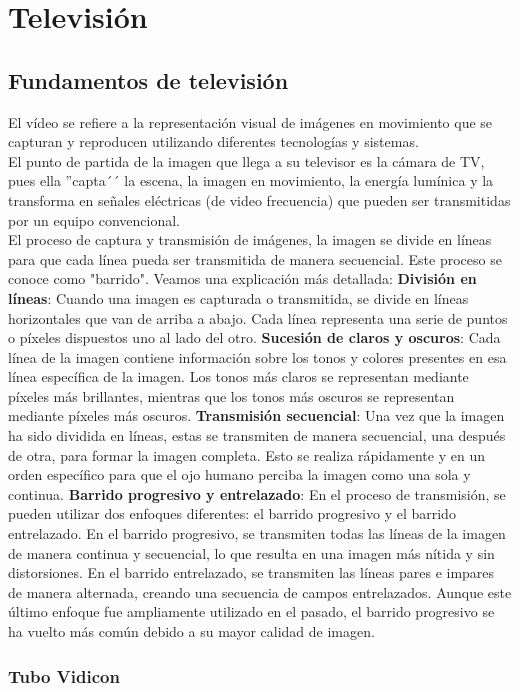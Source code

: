 \documentclass[
	12pt, %
	fleqn, %
	a4paper, %
	oneside, %
]{LegrandOrangeBook}
\begin{document}
\chapter{Televisión}
\section{Fundamentos de televisión}
El vídeo se refiere a la representación visual de imágenes en movimiento que se capturan y reproducen utilizando diferentes tecnologías y sistemas. \\
El punto de partida de la imagen que llega a su televisor es la cámara de TV, pues ella ''capta´´ la escena, la imagen en movimiento, la energía lumínica  y la transforma en señales eléctricas (de video frecuencia) que pueden ser transmitidas por un equipo convencional.\\
El proceso de captura y transmisión de imágenes, la imagen se divide en líneas para que cada línea pueda ser transmitida de manera secuencial. Este proceso se conoce como "barrido". Veamos una explicación más detallada:
\textbf{División en líneas}: Cuando una imagen es capturada o transmitida, se divide en líneas horizontales que van de arriba a abajo. Cada línea representa una serie de puntos o píxeles dispuestos uno al lado del otro.
\textbf{Sucesión de claros y oscuros}: Cada línea de la imagen contiene información sobre los tonos y colores presentes en esa línea específica de la imagen. Los tonos más claros se representan mediante píxeles más brillantes, mientras que los tonos más oscuros se representan mediante píxeles más oscuros.
\textbf{Transmisión secuencial}: Una vez que la imagen ha sido dividida en líneas, estas se transmiten de manera secuencial, una después de otra, para formar la imagen completa. Esto se realiza rápidamente y en un orden específico para que el ojo humano perciba la imagen como una sola y continua.
\textbf{Barrido progresivo y entrelazado}: En el proceso de transmisión, se pueden utilizar dos enfoques diferentes: el barrido progresivo y el barrido entrelazado. En el barrido progresivo, se transmiten todas las líneas de la imagen de manera continua y secuencial, lo que resulta en una imagen más nítida y sin distorsiones. En el barrido entrelazado, se transmiten las líneas pares e impares de manera alternada, creando una secuencia de campos entrelazados. Aunque este último enfoque fue ampliamente utilizado en el pasado, el barrido progresivo se ha vuelto más común debido a su mayor calidad de imagen.
\subsection{Tubo Vidicon}
\end{document}
